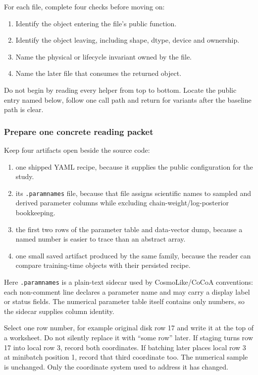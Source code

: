 \documentclass[10pt,aps,prd,twocolumn,nofootinbib]{revtex4-2}
\newcommand{\code}[1]{\texttt{#1}}
\begin{document}
For each file, complete four checks before moving on:
\begin{enumerate}
  \item Identify the object entering the file's public function.
  \item Identify the object leaving, including shape, dtype, device and ownership.
  \item Name the physical or lifecycle invariant owned by the file.
  \item Name the later file that consumes the returned object.
\end{enumerate}
Do not begin by reading every helper from top to bottom.  Locate the public
entry named below, follow one call path and return for variants after the
baseline path is clear.

\subsubsection{Prepare one concrete reading packet}

Keep four artifacts open beside the source code:
\begin{enumerate}
  \item one shipped YAML recipe, because it supplies the public configuration
        for the study.
  \item its \code{.paramnames} file, because that file assigns scientific
        names to sampled and derived parameter columns while excluding
        chain-weight/log-posterior bookkeeping.
  \item the first two rows of the parameter table and data-vector dump, because
        a named number is easier to trace than an abstract array.
  \item one small saved artifact produced by the same family, because the
        reader can compare training-time objects with their persisted recipe.
\end{enumerate}
Here \code{.paramnames} is a plain-text sidecar used by CosmoLike/CoCoA
conventions: each non-comment line declares a
parameter name and may carry a display label or status fields.  The numerical
parameter table itself contains only numbers, so the sidecar supplies column
identity.

Select one row number, for example original disk row 17 and write it at the
top of a worksheet.  Do not silently replace it with ``some row'' later.  If
staging turns row 17 into local row 3, record both coordinates.  If batching
later places local row 3 at minibatch position 1, record that third coordinate
too.  The numerical sample is unchanged.  Only the coordinate system used to
address it has changed.
\end{document}
